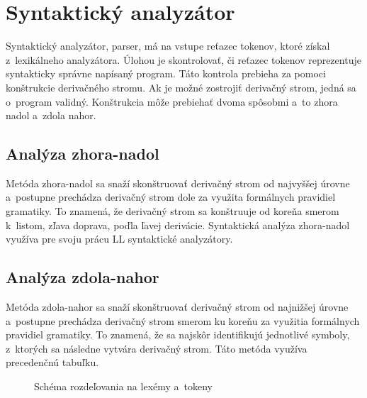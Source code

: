 \section{Syntaktický analyzátor}
Syntaktický analyzátor, parser, má na vstupe reťazec tokenov, ktoré získal
z~lexikálneho analyzátora. Úlohou je skontrolovať, či
reťazec tokenov reprezentuje syntakticky správne napísaný program. Táto kontrola
prebieha za pomoci konštrukcie derivačného stromu. Ak je možné zostrojiť derivačný strom,
jedná sa o~program validný. Konštrukcia môže prebiehať dvoma spôsobmi a~to zhora
nadol a~zdola nahor\cite{meduna}. 

\subsection{Analýza zhora-nadol}
Metóda zhora-nadol sa snaží skonštruovať derivačný strom od najvyššej úrovne a~postupne prechádza derivačný strom dole za využita formálnych pravidiel gramatiky. To znamená, že derivačný strom sa konštruuje od koreňa smerom k~listom, zľava doprava, poďla ľavej derivácie. Syntaktická analýza zhora-nadol využíva pre svoju prácu LL syntaktické analyzátory\cite{aho}.

\subsection{Analýza zdola-nahor}
Metóda zdola-nahor sa snaží skonštruovať derivačný strom od najnižšej úrovne a~postupne prechádza derivačný strom smerom ku koreňu za využitia formálnych pravidiel gramatiky. To znamená, že sa najskôr identifikujú jednotlivé symboly, z~ktorých sa následne vytvára derivačný strom. Táto metóda využíva precedenčnú tabuľku\cite{aho}.

\begin{center}
\begin{figure}
\caption{Schéma rozdeľovania na lexémy a~tokeny}
\label{fig:lex}
\end{figure}
\end{center}

